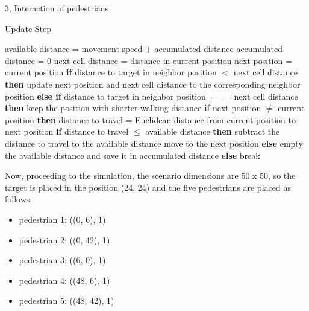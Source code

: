 \documentclass[10pt,a4paper]{article}
\begin{document}
\begin{task}{3, Interaction of pedestrians}
\begin{algorithm}[H]
	\caption{Update Step} 
	\label{alg:update_step}
	\begin{algorithmic}[1]
	    \State available distance = movement speed + accumulated distance
	    \State accumulated distance = 0
		    \State next cell distance = distance in current position
		    \State next position = current position
				\State \textbf{if} {distance to target in neighbor position $<$ next cell distance} \textbf{then}
				\State \hspace{4mm} update next position and next cell distance to the corresponding neighbor position
                \State \textbf{else if} distance to target in neighbor position $==$ next cell distance \textbf{then}
                \State \hspace{4mm} keep the position with shorter walking distance
			\EndFor
			\State \textbf{if} next position $\neq$ current position \textbf{then}
			    \State \hspace{4mm} distance to travel = Euclidean distance from current position to next position
			    \State \hspace{4mm} \textbf{if} distance to travel $\leq$ available distance \textbf{then}
			        \State \hspace{8mm} subtract the distance to travel to the
			        available distance
			        \State \hspace{8mm} move to the next position
			    \State \hspace{4mm} \textbf{else} empty the available distance and save it in accumulated distance
			\State \textbf{else} break
		\EndWhile
	\end{algorithmic} 
\end{algorithm}

Now, proceeding to the simulation, the scenario dimensions are 50 x 50, so the target is placed in the position (24, 24) and the five pedestrians are placed as follows:
\begin{itemize}
    \item pedestrian 1: ((0, 6), 1)
    \item pedestrian 2: ((0, 42), 1)
    \item pedestrian 3: ((6, 0), 1)
    \item pedestrian 4: ((48, 6), 1)
    \item pedestrian 5: ((48, 42), 1)
\end{itemize}


\end{task}
\end{document}
